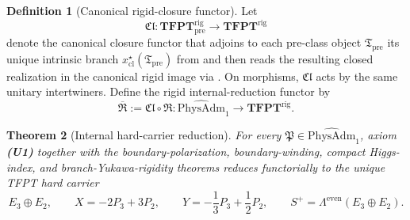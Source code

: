 \documentclass[11pt,a4paper]{article}
\newtheorem{theorem}{Theorem}[section]
\theoremstyle{definition}
\newtheorem{definition}[theorem]{Definition}
\theoremstyle{remark}
\newcommand{\Tpre}{\mathfrak T_{\mathrm{pre}}}
\newcommand{\PhysAdmOne}{\widehat{\mathrm{PhysAdm}}_1}
\newcommand{\Runiv}{\mathfrak R}
\newcommand{\Clrig}{\mathfrak{Cl}}
\newcommand{\Runivrig}{\overline{\Runiv}}
\begin{document}
\begin{definition}[Canonical rigid-closure functor]
\label{def:rigid-closure-functor}
Let
\[
\Clrig:\mathbf{TFPT}^{\mathrm{rig}}_{\mathrm{pre}}\to \mathbf{TFPT}^{\mathrm{rig}}
\]
denote the canonical closure functor that adjoins to each pre-class object $\Tpre$ its unique
intrinsic branch $x_{\mathrm{cl}}^\star(\Tpre)$ from  and then reads
the resulting closed realization in the canonical rigid image via
. On morphisms,
$\Clrig$ acts by the same unitary intertwiners. Define the rigid internal-reduction functor by
\[
\Runivrig:=\Clrig\circ \Runiv:\PhysAdmOne\to \mathbf{TFPT}^{\mathrm{rig}}.
\]
\end{definition}

\begin{theorem}[Internal hard-carrier reduction]
\label{prop:universal-carrier-reduction}
For every $\mathfrak P\in\PhysAdmOne$, axiom \textbf{(U1)} together with the boundary-polarization,
boundary-winding, compact Higgs-index, and branch-Yukawa-rigidity theorems reduces functorially to
the unique TFPT hard carrier
\[
E_3\oplus E_2,
\qquad
X=-2P_3+3P_2,
\qquad
Y=-\frac13P_3+\frac12P_2,
\qquad
S^+=\Lambda^{\mathrm{even}}(E_3\oplus E_2).
\]
\end{theorem}
\end{document}
